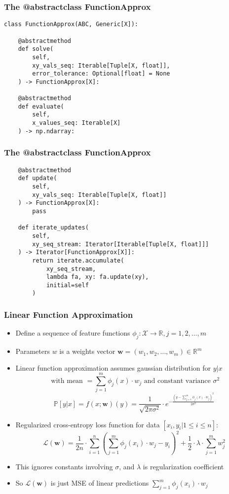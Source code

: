 \documentclass{beamer}
\begin{document}
\begin{frame}[fragile]
\frametitle{The @abstractclass FunctionApprox}
\pause
\begin{lstlisting}
class FunctionApprox(ABC, Generic[X]):

    @abstractmethod
    def solve(
        self,
        xy_vals_seq: Iterable[Tuple[X, float]],
        error_tolerance: Optional[float] = None
    ) -> FunctionApprox[X]:
    
    @abstractmethod
    def evaluate(
        self,
        x_values_seq: Iterable[X]
    ) -> np.ndarray:
\end{lstlisting}
\end{frame}

\begin{frame}[fragile]
\frametitle{The @abstractclass FunctionApprox}
\pause
\begin{lstlisting}
    @abstractmethod
    def update(
        self,
        xy_vals_seq: Iterable[Tuple[X, float]]
    ) -> FunctionApprox[X]:
        pass
        
    def iterate_updates(
        self,
        xy_seq_stream: Iterator[Iterable[Tuple[X, float]]]
    ) -> Iterator[FunctionApprox[X]]:
        return iterate.accumulate(
            xy_seq_stream,
            lambda fa, xy: fa.update(xy),
            initial=self
        )   
\end{lstlisting}
\end{frame}


\begin{frame}
\frametitle{Linear Function Approximation}
\pause
\begin{itemize}[<+->]
\item Define a sequence of feature functions $\phi_j: \mathcal{X} \rightarrow \mathbb{R}, j = 1, 2, \ldots, m$
\item Parameters $w$ is a weights vector $\bm{w} = (w_1, w_2, \ldots, w_m) \in \mathbb{R}^m$
\item Linear function approximation assumes gaussian distribution for $y|x$
$$\text{ with mean } = \sum_{j=1}^m \phi_j(x) \cdot w_j \text{ and constant variance } \sigma^2$$
$$\mathbb{P}[y|x] = f(x;\bm{w})(y) = \frac {1} {\sqrt{2\pi \sigma^2}} \cdot e^{-\frac {(y - \sum_{j=1}^m \phi_j(x) \cdot w_j)^2} {2\sigma^2}}$$
\item Regularized cross-entropy loss function for data $[x_i, y_i|1 \leq i \leq n]$:
$$\mathcal{L}(\bm{w}) = \frac 1 {2n} \cdot \sum_{i=1}^n (\sum_{j=1}^m \phi_j(x_i) \cdot w_j - y_i)^2 + \frac 1 2 \cdot\lambda \cdot \sum_{j=1}^m w_j^2$$
\item This ignores constants involving $\sigma$, and $\lambda$ is regularization coefficient
\item So $\mathcal{L}(\bm{w})$ is just MSE of linear predictions $\sum_{j=1}^m \phi_j(x_i) \cdot w_j$
\end{itemize}
\end{frame}
\end{document}
